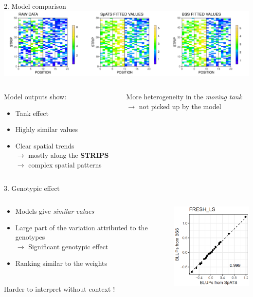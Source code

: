 \documentclass[]{beamer}
\begin{document}
\begin{frame}{2. Model comparison}
\centering
\includegraphics[width = \textwidth]{Pictures/model_comparison.pdf}
\flushleft
\begin{columns}
\begin{column}{0.6\textwidth}
Model outputs show:
\begin{itemize}
	\item Tank effect
	\item Highly similar values
	\item Clear spatial trends\\
	$\rightarrow$ mostly along the \textbf{STRIPS}\\
	$\rightarrow$ complex spatial patterns
\end{itemize}
\end{column}
\begin{column}{0.4\textwidth}
\danger  More heterogeneity in the \emph{moving tank}\\
$\rightarrow$ not picked up by the model
\end{column}
\end{columns}

\end{frame}

\begin{frame}{3. Genotypic effect}
\begin{columns}
	\begin{column}{0.6\textwidth}
	\begin{itemize}
		\item Models give \emph{similar values}
		\item Large part of the variation attributed to the genotypes\\
		$\rightarrow$ Significant genotypic effect
		\item Ranking similar to the weights
	\end{itemize}
	~\\
	 \danger Harder to interpret without context !
	\end{column}
	
	\begin{column}{0.4\textwidth}
	\centering
	\includegraphics[width =4.5cm]{Pictures/GENO.PNG}
	\end{column}
\end{columns}
\end{frame}
\end{document}
